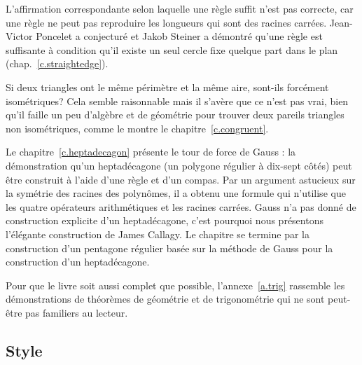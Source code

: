 L'affirmation correspondante selon laquelle une règle suffit n'est pas  correcte, car une règle ne peut pas reproduire les longueurs qui sont des racines carrées. Jean-Victor Poncelet a conjecturé et Jakob Steiner a démontré qu'une règle est suffisante à condition qu'il existe un seul cercle fixe quelque part dans le plan (chap.~\ref{c.straightedge}).

Si deux triangles ont le même périmètre et la même aire, sont-ils forcément isométriques? Cela semble raisonnable mais il s'avère que ce n'est pas vrai, bien qu'il faille un peu d'algèbre et de géométrie pour trouver deux pareils triangles non isométriques, comme le montre le chapitre~\ref{c.congruent}.

Le chapitre~\ref{c.heptadecagon} présente le tour de force de Gauss : la démonstration qu'un heptadécagone (un polygone régulier à dix-sept côtés) peut être construit à l'aide d'une règle et d'un compas. Par un argument astucieux sur la symétrie des racines des polynômes, il a obtenu une formule qui n'utilise que les quatre opérateurs arithmétiques et les racines carrées. Gauss n'a pas donné de construction explicite d'un heptadécagone, c'est pourquoi nous présentons l'élégante construction de James Callagy. Le chapitre se termine par la construction d'un pentagone régulier basée sur la méthode de Gauss pour la construction d'un heptadécagone.

Pour que le livre soit aussi complet que possible, l'annexe~\ref{a.trig} rassemble les démonstrations de théorèmes de géométrie et de trigonométrie qui ne sont peut-être pas familiers au lecteur.

\subsection*{Style}

